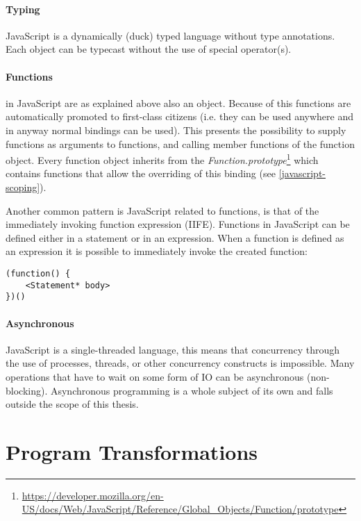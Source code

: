 \paragraph{Typing} \label{javascript-typing}
JavaScript is a dynamically (duck) typed language without type annotations. Each object can be typecast without the use of special operator(s). 

\paragraph{Functions} \label{javascript-functions}
in JavaScript are as explained above also an object. Because of this functions are automatically promoted to first-class citizens (i.e. they can be used anywhere and in anyway normal bindings can be used). This presents the possibility to supply functions as arguments to functions, and calling member functions of the function object. Every function object inherits from the \textit{Function.prototype}\footnote{\url{https://developer.mozilla.org/en-US/docs/Web/JavaScript/Reference/Global_Objects/Function/prototype}} which contains functions that allow the overriding of this binding (see \ref{javascript-scoping}).

Another common pattern is JavaScript related to functions, is that of the immediately invoking function expression (IIFE). Functions in JavaScript can be defined either in a statement or in an expression. When a function is defined as an expression it is possible to immediately invoke the created function:

\begin{lstlisting}[title=IIFE,caption={Immediately invoking function expression}]
(function() {
	<Statement* body>
})()
\end{lstlisting}

\paragraph{Asynchronous}
JavaScript is a single-threaded language, this means that concurrency through the use of processes, threads, or other concurrency constructs is impossible. Many operations that have to wait on some form of IO can be asynchronous (non-blocking). Asynchronous programming is a whole subject of its own and falls outside the scope of this thesis.

\section{Program Transformations}

